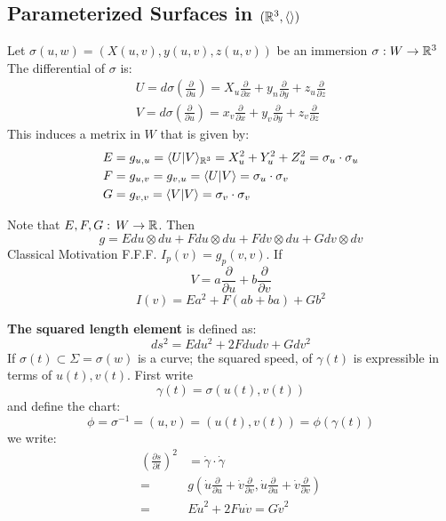 \subsection{Parameterized Surfaces in $(\mathbb{R}^3,\langle \rangle)$}
Let $\sigma(u,w) = (X(u,v),y(u,v),z(u,v))$ be an immersion $\sigma: W \to \mathbb{R}^3$ The differential of $\sigma$ is:
\begin{gather*}
    U=d\sigma\left( \frac{\partial}{\partial u}\right) = X_u \frac{\partial}{\partial x} + y_n  \frac{\partial}{\partial y} + z_u  \frac{\partial}{\partial z} \\
        V = d\sigma \left( \frac{\partial}{\partial u }\right) = x_v \frac{\partial}{\partial x} + y_v  \frac{\partial}{\partial y} + z_v  \frac{\partial}{\partial z} 
    \end{gather*}
    This induces a metrix in $W$ that is given by:
    \begin{align*}
        E&=g_{u,u} = \langle U | V \rangle _{\mathbb{R}^3} = X^2_u + Y^2_u + Z^2_u = \sigma_u \cdot \sigma_u\\
        F& = g_{u,v} = g_{v,u} = \langle U | V\rangle = \sigma_u \cdot \sigma_v\\
        G& =  g_{v,v} = \langle V | V\rangle = \sigma_v \cdot \sigma_v
    \end{align*}

    Note that $E,F,G:\, W\to \mathbb{R}$. Then 
    $$g= Edu \otimes du + Fdu\otimes du + Fdv\otimes du + Gdv\otimes dv$$
    Classical Motivation F.F.F. $I_p(v) = g_p (v,v)$. If 
    $$V= a\frac{\partial}{\partial u} + b \frac{\partial}{\partial v}$$  
    $$I(v) = Ea^2 + F(ab+ba) +Gb^2$$

    \begin{ddef}
        \textbf{The squared length element} is defined as:
        $$ds^2 = Edu^2 + 2Fdudv + Gdv^2$$
        If $\sigma(t) \subset \Sigma = \sigma(w) $ is a curve; the squared speed, of $\gamma(t) $ is expressible in terms of $u(t),v(t)$. First write
        $$\gamma(t) = \sigma(u(t),v(t))$$
        and define the chart:
        $$\phi = \sigma^{-1} = (u,v) = (u(t),v(t)) = \phi(\gamma(t))$$
        we write:
        \begin{align*}
            \left(\frac{\partial s}{\partial  t}\right)^2 &= \dot \gamma\cdot\dot\gamma \\
    =                                                      &g(\dot u \frac{\partial}{\partial u} + \dot v\frac{\partial}{\partial v},\dot u \frac{\partial}{\partial u} + \dot v\frac{\partial}{\partial v}) \\
    =                                                      &E\dot u^2 + 2F \dot u\dot v = G \dot v ^2
        \end{align*}
    \end{ddef}

